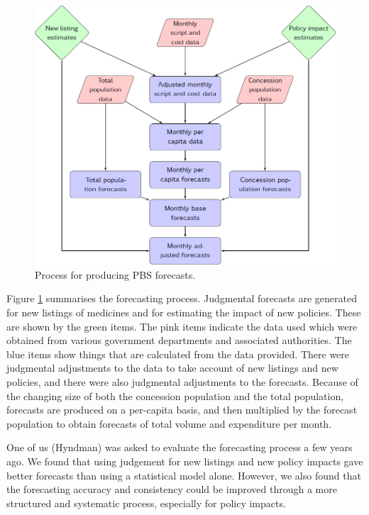 \documentclass[]{book}
\begin{document}
\begin{figure}

{\centering \includegraphics[width=0.9\linewidth]{PBSprocess} 

}

\caption{Process for producing PBS forecasts.}\label{fig:pbsdiagram}
\end{figure}

Figure \ref{fig:pbsdiagram} summarises the forecasting process. Judgmental forecasts are generated for new listings of medicines and for estimating the impact of new policies. These are shown by the green items. The pink items indicate the data used which were obtained from various government departments and associated authorities. The blue items show things that are calculated from the data provided. There were judgmental adjustments to the data to take account of new listings and new policies, and there were also judgmental adjustments to the forecasts. Because of the changing size of both the concession population and the total population, forecasts are produced on a per-capita basis, and then multiplied by the forecast population to obtain forecasts of total volume and expenditure per month.

One of us (Hyndman) was asked to evaluate the forecasting process a few years ago. We found that using judgement for new listings and new policy impacts gave better forecasts than using a statistical model alone. However, we also found that the forecasting accuracy and consistency could be improved through a more structured and systematic process, especially for policy impacts.
\end{document}
